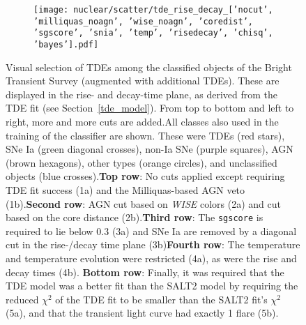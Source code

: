 \begin{figure}[htb]
\begin{subfigure}[b]{0.49\textwidth}
    \end{subfigure}
    \begin{subfigure}[b]{0.49\textwidth}
        \centering
        \texttt{[image: nuclear/scatter/tde\_rise\_decay\_['nocut', 'milliquas\_noagn', 'wise\_noagn', 'coredist', 'sgscore', 'snia', 'temp', 'risedecay', 'chisq', 'bayes'].pdf]}
    \end{subfigure}
    \caption[BTS selection]{Visual selection of TDEs among the classified objects of the Bright Transient Survey (augmented with additional TDEs). These are displayed in the rise- and decay-time plane, as derived from the TDE fit (see Section~\ref{tde_model}). From top to bottom and left to right, more and more cuts are added.\newline \newline All classes also used in the training of the classifier are shown. These were TDEs (red stars), SNe Ia (green diagonal crosses), non-Ia SNe (purple squares), AGN (brown hexagons), other types (orange circles), and unclassified objects (blue crosses).\newline \newline \textbf{Top row}: No cuts applied except requiring TDE fit success (1a) and the Milliquas-based AGN veto (1b).\newline \newline \textbf{Second row}: AGN cut based on \textit{WISE} colors (2a) and cut based on the core distance (2b).\newline \newline \textbf{Third row}: The \texttt{sgscore} is required to lie below 0.3 (3a) and SNe Ia are removed by a diagonal cut in the rise-/decay time plane (3b)\newline \newline \textbf{Fourth row}: The temperature and temperature evolution were restricted (4a), as were the rise and decay times (4b). \newline \newline \textbf{Bottom row}: Finally, it was required that the TDE model was a better fit than the SALT2 model by requiring the reduced $\chi^2$ of the TDE fit to be smaller than the SALT2 fit's $\chi^2$ (5a), and that the transient light curve had exactly 1 flare (5b).}
\end{figure}


